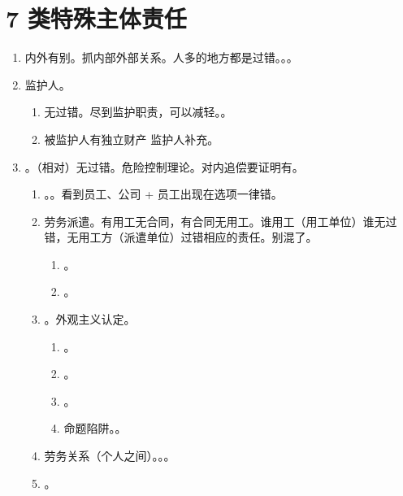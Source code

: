 \section{7 类特殊主体责任}
\begin{enumerate}
  \item 内外有别。抓内部外部关系。人多的地方都是过错。。。
  \item 监护人。
        \begin{enumerate}
          \item 无过错。尽到监护职责，可以减轻。。
          \item 被监护人有独立财产 \yjt 监护人补充。
        \end{enumerate}
  \item {}。（相对）无过错。危险控制理论。对内追偿要证明有。
        \begin{enumerate}
          \item {}。。看到员工、公司 + 员工出现在选项一律错。
          \item 劳务派遣。有用工无合同，有合同无用工。谁用工（用工单位）谁无过错，无用工方（派遣单位）过错相应的责任。别混了。
                \begin{enumerate}
                  \item {}。
                  \item {}。
                \end{enumerate}
          \item {}。外观主义认定。
                \begin{enumerate}
                  \item {}。
                  \item {}。
                  \item {}。
                  \item 命题陷阱。。
                \end{enumerate}
          \item 劳务关系（个人之间）。。。
          \item \sjt {}。

\end{enumerate}
\end{enumerate}
